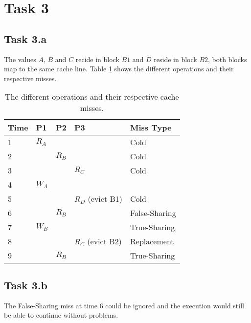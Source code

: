 \section{Task 3}
\subsection{Task 3.a}


The values $A$, $B$ and $C$ recide in block $B1$ and $D$ reside in block $B2$,
both blocks map to the same cache line. Table \ref{tab:t3a} shows the different
operations and their respective misses.

\begin{table}[]
\centering
\begin{tabular}{lllll}
Time                   & P1    & P2    & P3                                    & Miss Type     \\ \hline
\multicolumn{1}{l|}{1} & $R_A$ &       & \multicolumn{1}{l|}{}                 & Cold          \\
\multicolumn{1}{l|}{2} &       & $R_B$ & \multicolumn{1}{l|}{}                 & Cold          \\
\multicolumn{1}{l|}{3} &       &       & \multicolumn{1}{l|}{$R_C$}            & Cold          \\
\multicolumn{1}{l|}{4} & $W_A$ &       & \multicolumn{1}{l|}{}                 &               \\
\multicolumn{1}{l|}{5} &       &       & \multicolumn{1}{l|}{$R_D$ (evict B1)} & Cold          \\
\multicolumn{1}{l|}{6} &       & $R_B$ & \multicolumn{1}{l|}{}                 & False-Sharing \\
\multicolumn{1}{l|}{7} & $W_B$ &       & \multicolumn{1}{l|}{}                 & True-Sharing  \\
\multicolumn{1}{l|}{8} &       &       & \multicolumn{1}{l|}{$R_C$ (evict B2)} & Replacement   \\
\multicolumn{1}{l|}{9} &       & $R_B$ & \multicolumn{1}{l|}{}                 & True-Sharing
\end{tabular}
\caption{The different operations and their respective cache misses.}
\label{tab:t3a}
\end{table}

\subsection{Task 3.b}
The False-Sharing miss at time $6$ could be ignored and the execution would
still be able to continue without problems.
